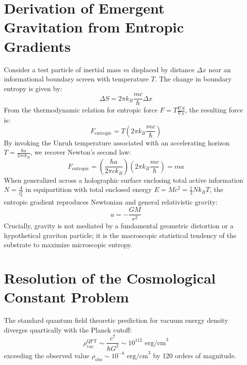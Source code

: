 \documentclass[11pt,a4paper]{article}
\begin{document}
\section{Derivation of Emergent Gravitation from Entropic Gradients}
Consider a test particle of inertial mass $m$ displaced by distance $\Delta x$ near an informational boundary screen with temperature $T$. The change in boundary entropy is given by:
\begin{equation}
\Delta S = 2\pi k_B \frac{mc}{\hbar} \Delta x
\end{equation}
From the thermodynamic relation for entropic force $F = T \frac{\nabla S}{\nabla x}$, the resulting force is:
\begin{equation}
F_{\text{entropic}} = T \left( 2\pi k_B \frac{mc}{\hbar} \right)
\end{equation}
By invoking the Unruh temperature associated with an accelerating horizon $T = \frac{\hbar a}{2\pi c k_B}$, we recover Newton's second law:
\begin{equation}
F_{\text{entropic}} = \left( \frac{\hbar a}{2\pi c k_B} \right) \left( 2\pi k_B \frac{mc}{\hbar} \right) = m a
\end{equation}
When generalized across a holographic surface enclosing total active information $N = \frac{A}{\ell_p^2}$ in equipartition with total enclosed energy $E = M c^2 = \frac{1}{2} N k_B T$, the entropic gradient reproduces Newtonian and general relativistic gravity:
\begin{equation}
a = -\frac{G M}{r^2}
\end{equation}
Crucially, gravity is not mediated by a fundamental geometric distortion or a hypothetical graviton particle; it is the macroscopic statistical tendency of the substrate to maximize microscopic entropy.

\section{Resolution of the Cosmological Constant Problem}
The standard quantum field theoretic prediction for vacuum energy density diverges quartically with the Planck cutoff:
\begin{equation}
\rho_{\text{vac}}^{\text{QFT}} \sim \frac{c^7}{\hbar G^2} \sim 10^{112} \text{ erg/cm}^3
\end{equation}
exceeding the observed value $\rho_{\text{obs}} \sim 10^{-8} \text{ erg/cm}^3$ by 120 orders of magnitude.
\end{document}
